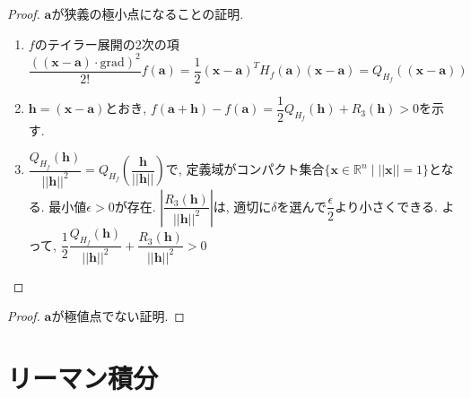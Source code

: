 \documentclass[dvipdfmx]{jsarticle}
\begin{document}
\begin{description}
        \begin{proof} $\bm{a}$が狭義の極小点になることの証明.
            \begin{enumerate}
                \item $f$のテイラー展開の2次の項$\dfrac{( (\bm{x} - \bm{a}) \cdot \mathrm{\mathrm{grad}})^2}{2!}f(\bm{a}) = \dfrac{1}{2}(\bm{x} - \bm{a})^T H_f(\bm{a}) (\bm{x} - \bm{a}) = Q_{H_f}((\bm{x} - \bm{a}))$
                \item $\bm{h} = (\bm{x} - \bm{a})$とおき, $f(\bm{a} + \bm{h}) - f(\bm{a}) = \dfrac{1}{2} Q_{H_f}(\bm{h}) + R_3(\bm{h}) > 0$を示す.
                \item $\dfrac{Q_{H_f}(\bm{h})}{||\bm{h}||^2}=Q_{H_f}(\dfrac{\bm{h}}{||\bm{h}||})$で, 定義域がコンパクト集合$\{ \bm{x} \in \mathbb{R}^n \mid ||\bm{x}|| = 1 \}$となる.
                最小値$\epsilon> 0$が存在. $|\dfrac{R_3(\bm{h})}{||\bm{h}||^2}|$は, 適切に$\delta$を選んで$\dfrac{\epsilon}{2}$より小さくできる.
                よって, $\dfrac{1}{2} \dfrac{Q_{H_f}(\bm{h})}{||\bm{h}||^2} + \dfrac{R_3(\bm{h})}{||\bm{h}||^2} > 0$
            \end{enumerate}
        \end{proof}
        \begin{proof} $\bm{a}$が極値点でない証明.
            
        \end{proof}
\end{description}

\section{リーマン積分}
\end{document}
